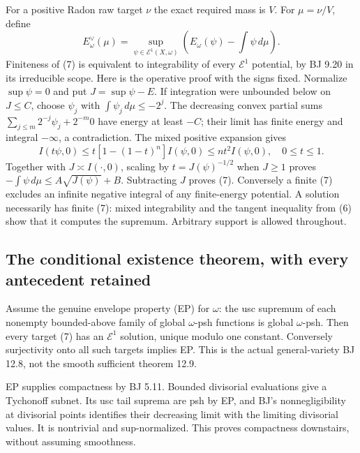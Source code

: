 \documentclass[
  11pt,
]{article}
\begin{document}
For a positive Radon raw target \(\nu\) the exact required mass is
\(V\). For \(\mu=\nu/V\), define \[
 E^\vee_\omega(\mu)=\sup_{\psi\in\mathcal E^1(X,\omega)}
       \left(E_\omega(\psi)-\int\psi\,d\mu\right).                     \tag{7}
\] Finiteness of (7) is equivalent to integrability of every
\(\mathcal E^1\) potential, by BJ 9.20 in its irreducible scope. Here is
the operative proof with the signs fixed. Normalize \(\sup\psi=0\) and
put \(J=\sup\psi-E\). If integration were unbounded below on \(J\le C\),
choose \(\psi_j\) with \(\int\psi_j\,d\mu\le-2^j\). The decreasing
convex partial sums \(\sum_{j\le m}2^{-j}\psi_j+2^{-m}0\) have energy at
least \(-C\); their limit has finite energy and integral \(-\infty\), a
contradiction. The mixed positive expansion gives
\[I(t\psi,0)\le t[1-(1-t)^n]I(\psi,0)\le nt^2 I(\psi,0),\quad0\le t\le1.\]
Together with \(J\asymp I(\cdot,0)\), scaling by \(t=J(\psi)^{-1/2}\)
when \(J\ge1\) proves \(-\int\psi\,d\mu\le A\sqrt{J(\psi)}+B\).
Subtracting \(J\) proves (7). Conversely a finite (7) excludes an
infinite negative integral of any finite-energy potential. A solution
necessarily has finite (7): mixed integrability and the tangent
inequality from (6) show that it computes the supremum. Arbitrary
support is allowed throughout.

\subsection{The conditional existence theorem, with every antecedent
retained}\label{the-conditional-existence-theorem-with-every-antecedent-retained}

Assume the genuine envelope property (EP) for \(\omega\): the usc
supremum of each nonempty bounded-above family of global \(\omega\)-psh
functions is global \(\omega\)-psh. Then every target (7) has an
\(\mathcal E^1\) solution, unique modulo one constant. Conversely
surjectivity onto all such targets implies EP. This is the actual
general-variety BJ 12.8, not the smooth sufficient theorem 12.9.

EP supplies compactness by BJ 5.11. Bounded divisorial evaluations give
a Tychonoff subnet. Its usc tail suprema are psh by EP, and BJ's
nonnegligibility at divisorial points identifies their decreasing limit
with the limiting divisorial values. It is nontrivial and
sup-normalized. This proves compactness downstairs, without assuming
smoothness.
\end{document}
